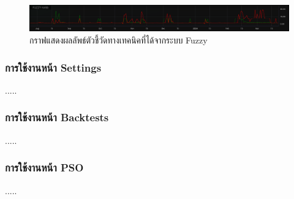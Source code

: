 \begin{figure}[h]
    \centering
    \includegraphics[width=\textwidth]{images/web-tuts/chart-fuzzy-on.PNG}
    \caption{กราฟแสดงผลลัพธ์ตัวชี้วัดทางเทคนิคที่ได้จากระบบ Fuzzy}
    \label{fig:chart-fuzzy-on}
\end{figure}
\FloatBarrier

\subsubsection{การใช้งานหน้า Settings}
.....

\subsubsection{การใช้งานหน้า Backtests}
.....

\subsubsection{การใช้งานหน้า PSO}
.....